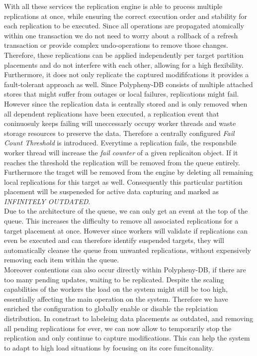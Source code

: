 With all these services the replication engine is able to process multiple replications at once, while ensuring the correct execution order and stability
for each replication to be executed. 
Since all operations are propagated atomically within one transaction we do not need to worry about a rollback of a refresh transaction or provide complex undo-operations 
to remove those changes. Therefore, these replications can be applied independently per target partition placements and do not interfere with each other, 
allowing for a high flexibility.\\
Furthermore, it does not only replicate the captured modififcations it provides a fault-tolerant approach as well. 
Since Polypheny-DB consists of multiple attached stores that might suffer from outages or local failures, replications might fail.
However since the replication data is centrally stored and is only removed when all dependent replications have been executed, 
a replication event that coninuosuly keeps failing will uneccessarly occupy worker threads and waste storage resources to preserve the data.
Therefore a centrally configured \emph{Fail Count Threshold} is introduced. Everytime a replication fails, the responsbile worker thread will increase the \textit{fail counter} 
of a given replicaiton object. If it reaches the threshold the replication will be removed from the queue entirely. 
Furthermore the traget will be removed from the engine by deleting all remaining local replications for this target as well.
Consequently this particular partition placement will be suspeneded for active data capturing and marked as \emph{INFINITELY OUTDATED}.\\

Due to the architecture of the queue, we can only get an event at the top of the queue. This increases the difficulty to remove all associated replications 
for a target placement at once. However since workers will validate if replications can even be executed and can therefore identify suspended targets, they will
automatically cleanse the queue from unwanted replications, without expensively removing each item within the queue.\\

Moreover contentions can also occur directly within Polypheny-DB, if there are too many pending updates, waiting to be replicated.
Despite the scaling capabilities of the workers the load on the system might still be too high, essentially affecting the main operation on the system.
Therefore we have enriched the configuration to globally enable or disable the replciation distribution. In constrast to labeleing data placements as outdated, 
and removing all pending replications for ever, we can now allow to temporarily stop the replication and only continue to capture modifications. This can help the system
to adapt to high load situations by focusing on its core funcitonality.\\


